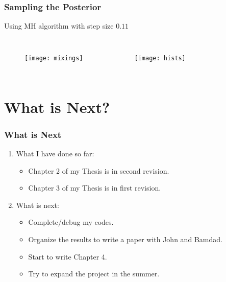 \documentclass[11pt]{beamer}
\theoremstyle{plain}
\theoremstyle{definition}
\begin{document}
\begin{frame}
\frametitle{Sampling the Posterior}
Using MH algorithm with step size $0.11$
\begin{columns}[c]
\column{1.5in}
\begin{figure}
\texttt{[image: mixings]}
\end{figure}

\column{1.5in}
\begin{figure}
\texttt{[image: hists]}
\end{figure}
\end{columns}
\end{frame}


\section{What is Next?}
\begin{frame}
\frametitle{What is Next}
\begin{enumerate}
\item What I have done so far:
	\begin{itemize}
	\item Chapter 2 of my Thesis is in second revision.
	\item Chapter 3 of my Thesis is in first revision.
	\end{itemize}

\item What is next:
	\begin{itemize}
	\item Complete/debug my codes.
	\item Organize the results to write a paper with John and Bamdad.
	\item Start to write Chapter 4.
	\item Try to expand the project in the summer.
	\end{itemize}
\end{enumerate}
\end{frame} 
\end{document}

